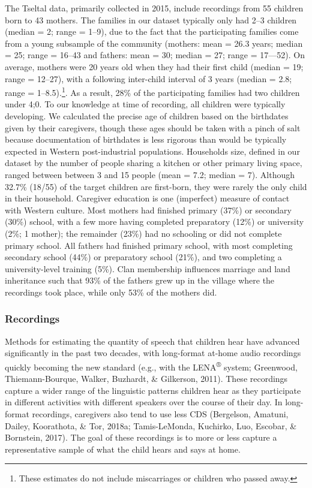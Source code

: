 \documentclass[floatsintext,man]{apa6}
\theoremstyle{definition}
\theoremstyle{definition}
\theoremstyle{definition}
\theoremstyle{remark}
\begin{document}
The Tseltal data, primarily collected in 2015, include recordings from
55 children born to 43 mothers. The families in our dataset typically
only had 2--3 children (median = 2; range = 1--9), due to the fact that
the participating families come from a young subsample of the community
(mothers: mean = 26.3 years; median = 25; range = 16--43 and fathers:
mean = 30; median = 27; range = 17---52). On average, mothers were 20
years old when they had their first child (median = 19; range = 12--27),
with a following inter-child interval of 3 years (median = 2.8; range =
1--8.5).\footnote{These estimates do not include miscarriages or
  children who passed away.}. As a result, 28\% of the participating
families had two children under 4;0. To our knowledge at time of
recording, all children were typically developing. We calculated the
precise age of children based on the birthdates given by their
caregivers, though these ages should be taken with a pinch of salt
because documentation of birthdates is less rigorous than would be
typically expected in Western post-industrial populations. Households
size, defined in our dataset by the number of people sharing a kitchen
or other primary living space, ranged between between 3 and 15 people
(mean = 7.2; median = 7). Although 32.7\% (18/55) of the target children
are first-born, they were rarely the only child in their household.
Caregiver education is one (imperfect) measure of contact with Western
culture. Most mothers had finished primary (37\%) or secondary (30\%)
school, with a few more having completed preparatory (12\%) or
university (2\%; 1 mother); the remainder (23\%) had no schooling or did
not complete primary school. All fathers had finished primary school,
with most completing secondary school (44\%) or preparatory school
(21\%), and two completing a university-level training (5\%). Clan
membership influences marriage and land inheritance such that 93\% of
the fathers grew up in the village where the recordings took place,
while only 53\% of the mothers did.

\subsubsection{Recordings}\label{methods-corpus-recs}

Methods for estimating the quantity of speech that children hear have
advanced significantly in the past two decades, with long-format at-home
audio recordings quickly becoming the new standard (e.g., with the
LENA\textsuperscript{®} system; Greenwood, Thiemann-Bourque, Walker,
Buzhardt, \& Gilkerson, 2011). These recordings capture a wider range of
the linguistic patterns children hear as they participate in different
activities with different speakers over the course of their day. In
long-format recordings, caregivers also tend to use less CDS (Bergelson,
Amatuni, Dailey, Koorathota, \& Tor, 2018a; Tamis-LeMonda, Kuchirko,
Luo, Escobar, \& Bornstein, 2017). The goal of these recordings is to
more or less capture a representative sample of what the child hears and
says at home.
\end{document}
